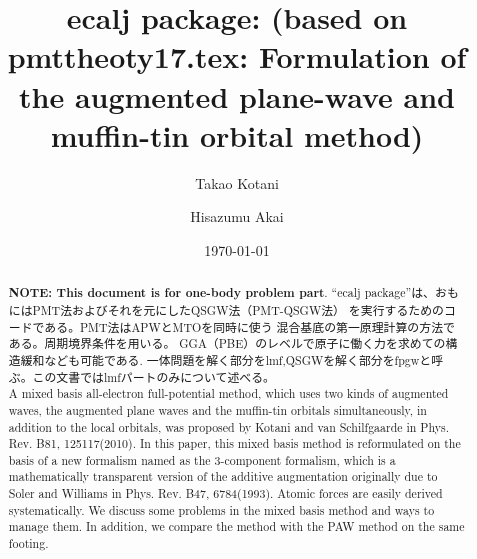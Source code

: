 \documentclass[twocolumn,showpacs,preprintnumbers,amsmath,amssymb,floatfix]{revtex4-1}
\begin{document}
\title{ecalj package: (based on pmttheoty17.tex:
Formulation of the augmented plane-wave and muffin-tin orbital method)}
\author{Takao Kotani}
\author{Hisazumu Akai}
\date{\today}

\begin{abstract}
{\bf NOTE: This document is for one-body problem part}.
``ecalj package''は、おもにはPMT法およびそれを元にしたQSGW法（PMT-QSGW法） 
を実行するためのコードである。PMT法はAPWとMTOを同時に使う
混合基底の第一原理計算の方法である。周期境界条件を用いる。
GGA（PBE）のレベルで原子に働く力を求めての構造緩和なども可能である.
一体問題を解く部分をlmf,QSGWを解く部分をfpgwと呼ぶ。この文書ではlmfパートのみについて述べる。\\

A mixed basis all-electron full-potential method, 
which uses two kinds of augmented waves, the augmented plane waves  
and the muffin-tin orbitals simultaneously, in addition to the
local orbitals, was proposed by Kotani and van Schilfgaarde in Phys. Rev. B81, 125117(2010). 
In this paper, this mixed basis method is reformulated on the basis of a new
formalism named as the 3-component formalism, which is a
mathematically transparent version of the additive
augmentation originally due to Soler and Williams in Phys. Rev. B47, 6784(1993). 
Atomic forces are easily derived systematically. 
We discuss some problems in the mixed basis method and ways to
manage them. In addition, we 
compare the method with the PAW method on the same footing. 
\end{abstract}
\maketitle

\end{document}
